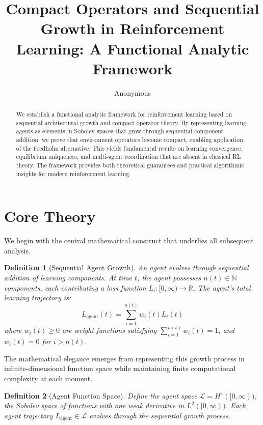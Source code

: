 \documentclass[11pt]{article}
\title{Compact Operators and Sequential Growth in Reinforcement Learning: A Functional Analytic Framework}
\author{Anonymous}
\date{}
\newtheorem{definition}{Definition}
\begin{document}
\maketitle

\begin{abstract}
We establish a functional analytic framework for reinforcement learning based on sequential architectural growth and compact operator theory. By representing learning agents as elements in Sobolev spaces that grow through sequential component addition, we prove that environment operators become compact, enabling application of the Fredholm alternative. This yields fundamental results on learning convergence, equilibrium uniqueness, and multi-agent coordination that are absent in classical RL theory. The framework provides both theoretical guarantees and practical algorithmic insights for modern reinforcement learning.
\end{abstract}

\section{Core Theory}

We begin with the central mathematical construct that underlies all subsequent analysis.

\begin{definition}[Sequential Agent Growth]
An agent evolves through sequential addition of learning components. At time $t$, the agent possesses $n(t) \in \mathbb{N}$ components, each contributing a loss function $L_i: [0,\infty) \to \mathbb{R}$. The agent's total learning trajectory is:
\begin{equation}
L_{\text{agent}}(t) = \sum_{i=1}^{n(t)} w_i(t) L_i(t)
\end{equation}
where $w_i(t) \geq 0$ are weight functions satisfying $\sum_{i=1}^{n(t)} w_i(t) = 1$, and $w_i(t) = 0$ for $i > n(t)$.
\end{definition}

The mathematical elegance emerges from representing this growth process in infinite-dimensional function space while maintaining finite computational complexity at each moment.

\begin{definition}[Agent Function Space]
Define the agent space $\mathcal{L} = H^1([0,\infty))$, the Sobolev space of functions with one weak derivative in $L^2([0,\infty))$. Each agent trajectory $L_{\text{agent}} \in \mathcal{L}$ evolves through the sequential growth process.
\end{definition}
\end{document}

